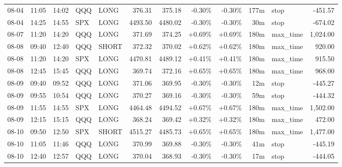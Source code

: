 \documentclass[11pt,a4paper,twoside]{article}
\begin{document}
\begin{center}
\begin{longtable}{>{\color{txtmain}}l l l l l r r r r r >{\color{txtmain}}l r}
08-04 & 11:05 & 14:02 & QQQ & LONG & 376.31 & 375.18 & \textcolor{lossred}{-0.30\%} & \textcolor{lossred}{-0.30\%} & 177m & stop & \textcolor{lossred}{-451.57} \\
08-04 & 14:25 & 14:55 & SPX & LONG & 4493.50 & 4480.02 & \textcolor{lossred}{-0.30\%} & \textcolor{lossred}{-0.30\%} & 30m & stop & \textcolor{lossred}{-674.02} \\
08-07 & 11:20 & 14:20 & QQQ & LONG & 371.69 & 374.25 & \textcolor{wingreen}{+0.69\%} & \textcolor{wingreen}{+0.69\%} & 180m & max\_time & \textcolor{wingreen}{1,024.00} \\
08-08 & 09:40 & 12:40 & QQQ & SHORT & 372.32 & 370.02 & \textcolor{wingreen}{+0.62\%} & \textcolor{wingreen}{+0.62\%} & 180m & max\_time & \textcolor{wingreen}{920.00} \\
08-08 & 11:20 & 14:20 & SPX & LONG & 4470.81 & 4489.12 & \textcolor{wingreen}{+0.41\%} & \textcolor{wingreen}{+0.41\%} & 180m & max\_time & \textcolor{wingreen}{915.50} \\
08-08 & 12:45 & 15:45 & QQQ & LONG & 369.74 & 372.16 & \textcolor{wingreen}{+0.65\%} & \textcolor{wingreen}{+0.65\%} & 180m & max\_time & \textcolor{wingreen}{968.00} \\
08-09 & 09:40 & 09:52 & QQQ & LONG & 371.06 & 369.95 & \textcolor{lossred}{-0.30\%} & \textcolor{lossred}{-0.30\%} & 12m & stop & \textcolor{lossred}{-445.27} \\
08-09 & 09:55 & 10:54 & QQQ & LONG & 370.27 & 369.16 & \textcolor{lossred}{-0.30\%} & \textcolor{lossred}{-0.30\%} & 59m & stop & \textcolor{lossred}{-444.32} \\
08-09 & 11:55 & 14:55 & SPX & LONG & 4464.48 & 4494.52 & \textcolor{wingreen}{+0.67\%} & \textcolor{wingreen}{+0.67\%} & 180m & max\_time & \textcolor{wingreen}{1,502.00} \\
08-09 & 12:15 & 15:15 & QQQ & LONG & 368.24 & 369.42 & \textcolor{wingreen}{+0.32\%} & \textcolor{wingreen}{+0.32\%} & 180m & max\_time & \textcolor{wingreen}{472.00} \\
08-10 & 09:50 & 12:50 & SPX & SHORT & 4515.27 & 4485.73 & \textcolor{wingreen}{+0.65\%} & \textcolor{wingreen}{+0.65\%} & 180m & max\_time & \textcolor{wingreen}{1,477.00} \\
08-10 & 11:05 & 11:46 & QQQ & LONG & 370.99 & 369.88 & \textcolor{lossred}{-0.30\%} & \textcolor{lossred}{-0.30\%} & 41m & stop & \textcolor{lossred}{-445.19} \\
08-10 & 12:40 & 12:57 & QQQ & LONG & 370.04 & 368.93 & \textcolor{lossred}{-0.30\%} & \textcolor{lossred}{-0.30\%} & 17m & stop & \textcolor{lossred}{-444.05} \\

\end{longtable}
\end{center}
\end{document}
